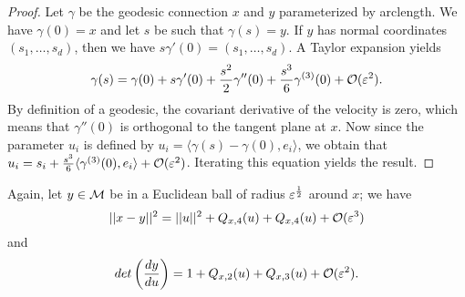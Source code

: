 \begin{proof}
Let $\gamma$ be the geodesic connection $x$ and $y$ parameterized by arclength. We have $\gamma(0)=x$ and let $s$ be such that $\gamma(s)=y$. If $y$ has normal coordinates $(s_1,\dots,s_d)$, then we have $s\gamma'(0)=(s_1,\dots,s_d)$. A Taylor expansion yields
\begin{equation*}
\gamma(s)=\gamma(0)+s\gamma'(0)+\frac{s^2}{2}\gamma''(0)+\frac{s^3}{6}\gamma^{(3)}(0)+\mathcal{O}(\varepsilon^2).
\end{equation*}
By definition of a geodesic, the covariant derivative of the velocity is zero, which means that $\gamma''(0)$ is orthogonal to the tangent plane at $x$. Now since the parameter $u_i$ is defined by $u_i=\langle\gamma(s)-\gamma(0),e_i\rangle$, we obtain that $u_i=s_i+\frac{s^3}{6}\langle\gamma^{(3)}(0),e_i\rangle+\mathcal{O}(\varepsilon^2)$. Iterating this equation yields the result.
\end{proof}

\begin{lemma}
Again, let $y\in\mathcal{M}$ be in a Euclidean ball of radius $\varepsilon^\frac{1}{2}$ around $x$; we have
\begin{equation}\label{eq:metricComparison}
||x-y||^2=||u||^2+Q_{x,4}(u)+Q_{x,4}(u)+\mathcal{O}(\varepsilon^3)
\end{equation}
and
\begin{equation}\label{eq:volumeComparison}
det\left(\frac{dy}{du}\right)=1+Q_{x,2}(u)+Q_{x,3}(u)+\mathcal{O}(\varepsilon^2).
\end{equation}
\end{lemma}

